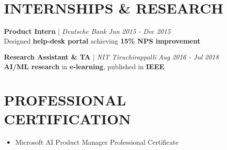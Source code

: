 \documentclass[10pt,a4paper]{article}
\begin{document}
\section{INTERNSHIPS \& RESEARCH}

\textbf{Product Intern} | \textit{Deutsche Bank} \hfill \textit{Jun 2015 - Dec 2015} \\
Designed \textbf{help-desk portal} achieving \textbf{15\% NPS improvement}

\vspace{4pt}

\textbf{Research Assistant \& TA} | \textit{NIT Tiruchirappalli} \hfill \textit{Aug 2016 - Jul 2018} \\
\textbf{AI/ML research} in \textbf{e-learning}, published in \textbf{IEEE}

\vspace{12pt}
\section{PROFESSIONAL CERTIFICATION}

\begin{itemize}[leftmargin=*]
    \item Microsoft AI Product Manager Professional Certificate 
\end{itemize}
\end{document}
